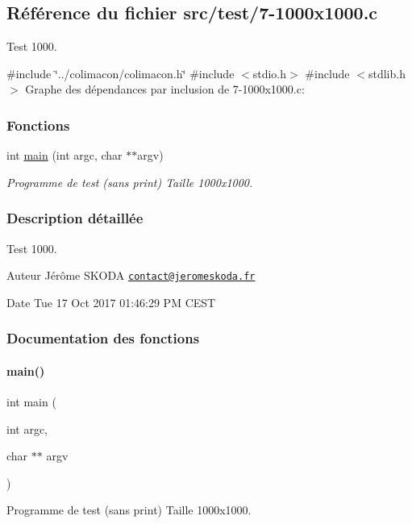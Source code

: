 \hypertarget{7-1000x1000_8c}{}\subsection{Référence du fichier src/test/7-\/1000x1000.c}
\label{7-1000x1000_8c}


Test 1000.  


{\ttfamily \#include \char`\"{}../colimacon/colimacon.\+h\char`\"{}}\newline
{\ttfamily \#include $<$stdio.\+h$>$}\newline
{\ttfamily \#include $<$stdlib.\+h$>$}\newline
Graphe des dépendances par inclusion de 7-\/1000x1000.c\+:
\subsubsection*{Fonctions}
\begin{DoxyCompactItemize}
\item 
int \hyperlink{7-1000x1000_8c_a3c04138a5bfe5d72780bb7e82a18e627}{main} (int argc, char $\ast$$\ast$argv)
\begin{DoxyCompactList}\small\item\em Programme de test (sans print) Taille 1000x1000. \end{DoxyCompactList}\end{DoxyCompactItemize}


\subsubsection{Description détaillée}
Test 1000. 

\begin{DoxyAuthor}{Auteur}
Jérôme S\+K\+O\+DA \href{mailto:contact@jeromeskoda.fr}{\tt contact@jeromeskoda.\+fr} 
\end{DoxyAuthor}
\begin{DoxyDate}{Date}
Tue 17 Oct 2017 01\+:46\+:29 PM C\+E\+ST 
\end{DoxyDate}


\subsubsection{Documentation des fonctions}
\mbox{\label{7-1000x1000_8c_a3c04138a5bfe5d72780bb7e82a18e627}} 
\paragraph{\texorpdfstring{main()}{main()}}
{\footnotesize\ttfamily int main (\begin{DoxyParamCaption}\item[{int}]{argc,  }\item[{char $\ast$$\ast$}]{argv }\end{DoxyParamCaption})}



Programme de test (sans print) Taille 1000x1000. 

